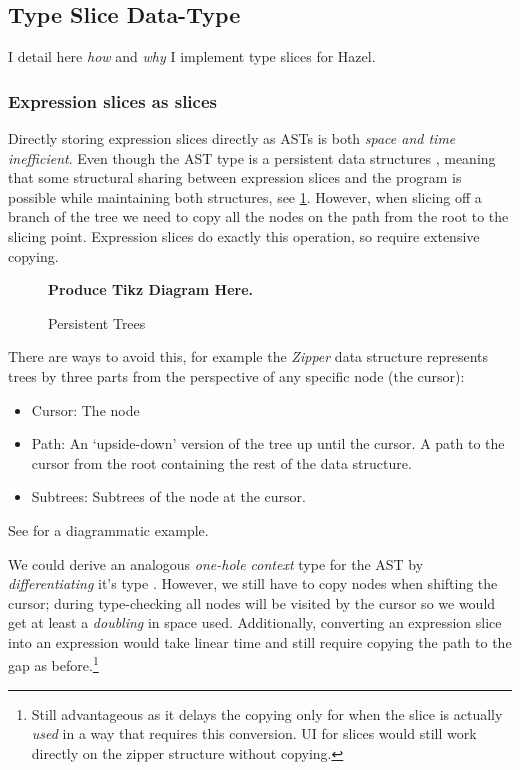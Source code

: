 \subsection{Type Slice Data-Type}\label{sec:TypeSliceDataType}
I detail here \textit{how} and \textit{why} I implement type slices for Hazel.

\subsubsection{Expression slices as slices}
Directly storing expression slices directly as ASTs is both \textit{space and time inefficient}. Even though the AST type is a persistent data structures \cite[ch. 2]{PurelyFunctionalDataStructures}, meaning that some structural sharing between expression slices and the program is possible while maintaining both structures, see \cref{fig:PersistentTrees}. However, when slicing off a branch of the tree we need to copy all the nodes on the path from the root to the slicing point. Expression slices do exactly this operation, so require extensive copying.
\begin{figure}[h]
\textbf{Produce Tikz Diagram Here.}
\caption{Persistent Trees}
\label{fig:PersistentTrees}
\end{figure}

There are ways to avoid this, for example the \textit{Zipper} data structure represents trees by three parts from the perspective of any specific node (the cursor):
\begin{itemize}
\item Cursor: The node 
\item Path: An `upside-down' version of the tree up until the cursor. A path to the cursor from the root containing the rest of the data structure.
\item Subtrees: Subtrees of the node at the cursor.
\end{itemize} 
See  for a diagrammatic example.

We could derive an analogous \textit{one-hole context} type for the AST by \textit{differentiating} it's type \cite{OneHoleContext, TypeDerivatives}. However, we still have to copy nodes when shifting the cursor; during type-checking all nodes will be visited by the cursor so we would get at least a \textit{doubling} in space used. Additionally, converting an expression slice into an expression would take linear time and still require copying the path to the gap as before.\footnote{Still advantageous as it delays the copying only for when the slice is actually \textit{used} in a way that requires this conversion. UI for slices would still work directly on the zipper structure without copying.} 

